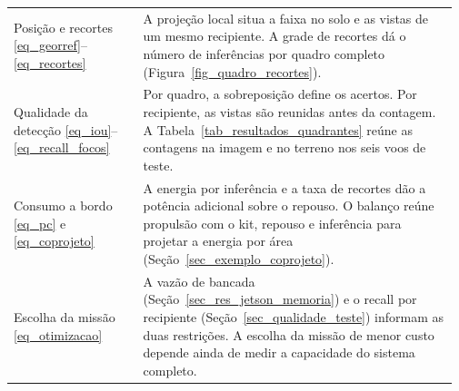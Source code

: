 \begin{table}[!htbp]
\begin{tabular}{@{}>{\raggedright\arraybackslash}p{0.29\linewidth}@{\hspace{0.03\linewidth}}>{\raggedright\arraybackslash}p{0.68\linewidth}@{}}
    Posição e recortes \newline \eqref{eq_georref}--\eqref{eq_recortes}
      & A projeção local situa a faixa no solo e as vistas de um mesmo recipiente. A grade de recortes dá o número de inferências por quadro completo (Figura~\ref{fig_quadro_recortes}). \\
    Qualidade da detecção \newline \eqref{eq_iou}--\eqref{eq_recall_focos}
      & Por quadro, a sobreposição define os acertos. Por recipiente, as vistas são reunidas antes da contagem. A Tabela~\ref{tab_resultados_quadrantes} reúne as contagens na imagem e no terreno nos seis voos de teste. \\
    Consumo a bordo \newline \eqref{eq_pc} e \eqref{eq_coprojeto}
      & A energia por inferência e a taxa de recortes dão a potência adicional sobre o repouso. O balanço reúne propulsão com o kit, repouso e inferência para projetar a energia por área (Seção~\ref{sec_exemplo_coprojeto}). \\
    Escolha da missão \newline \eqref{eq_otimizacao}
      & A vazão de bancada (Seção~\ref{sec_res_jetson_memoria}) e o recall por recipiente (Seção~\ref{sec_qualidade_teste}) informam as duas restrições. A escolha da missão de menor custo depende ainda de medir a capacidade do sistema completo. \\
    \hline
  \end{tabular}
\end{table}

